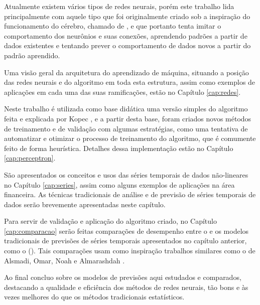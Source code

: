 Atualmente existem vários tipos de redes neurais, porém este trabalho lida principalmente com aquele tipo que foi originalmente criado sob a inspiração do funcionamento do cérebro, chamado de , e que portanto tenta imitar o comportamento dos neurônios e suas conexões, aprendendo padrões a partir de dados existentes e tentando prever o comportamento de dados novos a partir do padrão aprendido.

Uma visão geral da arquitetura do aprendizado de máquina, situando a posição das redes neurais e do algoritmo  em toda esta estrutura, assim como exemplos de aplicações em cada uma das suas ramificações, estão no Capítulo \ref{cap:redes}.

Neste trabalho é utilizada como base didática uma versão simples do algoritmo  feita e explicada por Kopec \citep{classic}, e a partir desta base, foram criados novos métodos de treinamento e de validação com algumas estratégias, como uma tentativa de automatizar e otimizar o processo de treinamento do algoritmo, que é comumente feito de forma heurística. Detalhes dessa implementação estão no Capítulo \ref{cap:perceptron}.

São apresentados os conceitos e usos das séries temporais de dados não-lineares no Capítulo \ref{cap:series}, assim como alguns exemplos de aplicações na área financeira. As técnicas tradicionais de análise e de previsão de séries temporais de dados serão brevemente apresentadas neste capítulo.

Para servir de validação e aplicação do algoritmo criado, no Capítulo \ref{cap:comparacao} serão feitas comparações de desempenho entre o  e os modelos tradicionais de previsões de séries temporais apresentados no capítulo anterior, como o  (). Tais comparações usam como inspiração trabalhos similares como o de Alsmadi, Omar, Noah e Almarashdah \citep{4809024}.

Ao final concluo sobre os modelos de previsões aqui estudados e comparados, destacando a qualidade e eficiência dos métodos de redes neurais, tão bons e às vezes melhores do que os métodos tradicionais estatísticos.

